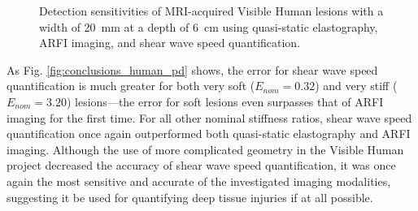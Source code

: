 			\begin{figure}[!htb]
				\centering
				\caption[Detection sensitivities of MRI-acquired Visible Human lesions using the three investigated imaging modalities]{Detection sensitivities of MRI-acquired Visible Human lesions with a width of \SI{20}{\mm} at a depth of \SI{6}{\cm} using quasi-static elastography, ARFI imaging, and shear wave speed quantification.}
				\label{fig:conclusion_human}
			\end{figure}

			As Fig. \ref{fig:conclusions_human_pd} shows, the error for shear wave speed quantification is much greater for both very soft ($E_{nom} = 0.32$) and very stiff ($E_{nom} = 3.20$) lesions---the error for soft lesions even surpasses that of ARFI imaging for the first time. For all other nominal stiffness ratios, shear wave speed quantification once again outperformed both quasi-static elastography and ARFI imaging. Although the use of more complicated geometry in the Visible Human project decreased the accuracy of shear wave speed quantification, it was once again the most sensitive and accurate of the investigated imaging modalities, suggesting it be used for quantifying deep tissue injuries if at all possible.

